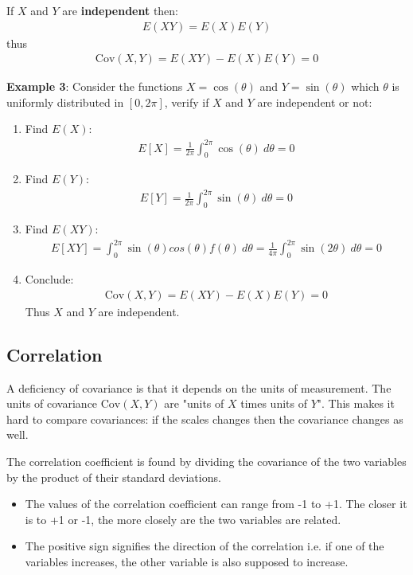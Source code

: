\documentclass[10pt,a4paper]{article}
\begin{document}
\begin{tcolorbox}[breakable,colback=white]
If $X$ and $Y$ are \textbf{independent} then:
\begin{align*}
    E(XY) = E(X)E(Y)
\end{align*}
thus 
\begin{align*}
    \text{Cov}(X,Y) = E(XY) - E(X)E(Y) = 0
\end{align*}
\end{tcolorbox}
\textbf{Example 3}: Consider the functions $X=\cos(\theta)$ and $Y=\sin(\theta)$ which $\theta$ is
uniformly distributed in $[0, 2\pi]$, verify if $X$ and $Y$ are independent or not:
\begin{enumerate}
    \item Find $E(X)$:
    \begin{align*}
        E[X] = \frac{1}{2\pi} \int_0^{2\pi} \cos(\theta)\: d\theta = 0
    \end{align*}
    \item Find $E(Y)$:  
    \begin{align*}
        E[Y] = \frac{1}{2\pi} \int_0^{2\pi} \sin(\theta)\: d\theta = 0
    \end{align*}
    \item Find $E(XY)$:
    \begin{align*}
        E[XY] = \int_0^{2\pi} \sin(\theta)cos(\theta)f(\theta) \: d\theta = \frac{1}{4\pi}\int_0^{2\pi} \sin(2\theta)\: d\theta = 0
    \end{align*}
    \item Conclude:
    \begin{align*}
        \text{Cov}(X,Y) = E(XY) - E(X)E(Y) = 0
    \end{align*}
    Thus $X$ and $Y$ are independent.
\end{enumerate}

\subsection{Correlation}

A deﬁciency of covariance is that it depends on the units of measurement. The units of covariance
$\text{Cov}(X,Y)$ are "units of $X$ times units of $Y$". This makes it hard to compare covariances: if the
scales changes then the covariance changes as well. 

The correlation coefficient is found by dividing the covariance of the two variables by the product
of their standard deviations. 
\begin{itemize}
    \item The values of the correlation coefficient can range from -1 to +1. The closer it is to +1 or -1, the more closely are the two variables are related. 
    \item The positive sign signifies the direction of the correlation i.e. if one of the variables increases, the other variable is also supposed to increase.
\end{itemize}
\end{document}
